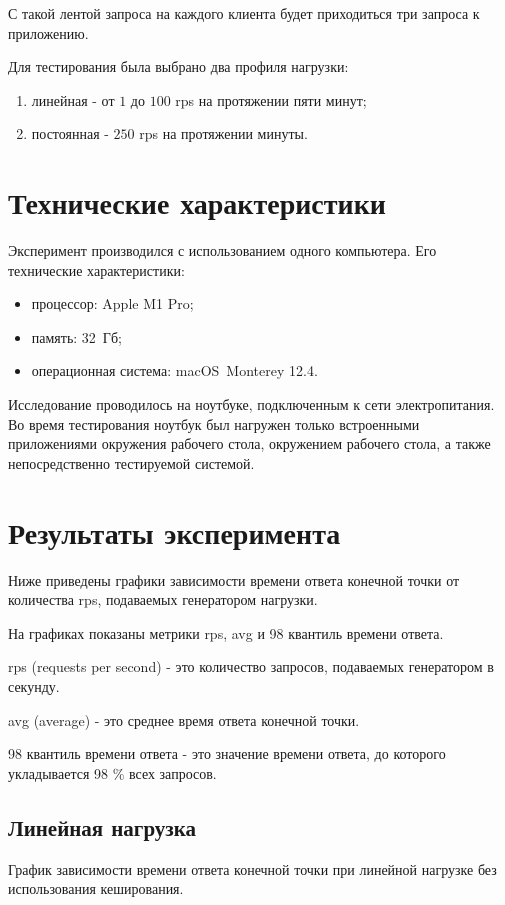 
С такой лентой запроса на каждого клиента будет приходиться три запроса к приложению. 

Для тестирования была выбрано два профиля нагрузки:
\begin{enumerate}
	\item линейная - от $1$ до $100$ rps на протяжении пяти минут;
	\item постоянная - $250$ rps на протяжении минуты.
\end{enumerate}



\section{Технические характеристики}
Эксперимент производился с использованием одного компьютера.
Его технические характеристики:
\begin{itemize}
	\item процессор: Apple M1 Pro;
	\item память: 32~Гб;
	\item операционная система: macOS~Monterey\cite{monterey} 12.4.
\end{itemize}

Исследование проводилось на ноутбуке, подключенным к сети электропитания. Во время тестирования ноутбук был нагружен только встроенными приложениями окружения рабочего стола, окружением рабочего стола, а также непосредственно тестируемой системой.

\newpage

\section{Результаты эксперимента}
Ниже приведены графики зависимости времени ответа конечной точки от количества rps, подаваемых генератором нагрузки.  

На графиках показаны метрики rps, avg и 98 квантиль времени ответа.

rps (requests per second) - это количество запросов, подаваемых генератором в секунду.  

avg (average) -  это среднее время ответа конечной точки.  

98 квантиль времени ответа - это значение времени ответа, до которого укладывается 98 \% всех запросов.

\subsection{Линейная нагрузка}
График зависимости времени ответа конечной точки при линейной нагрузке без использования кеширования.   

